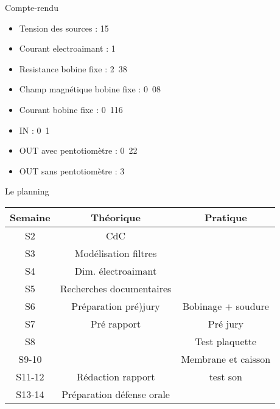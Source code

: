 \documentclass[pdf]{beamer}
\begin{document}
\begin{frame}{Compte-rendu}
	\begin{itemize}
		\item Tension des sources :  \unit{15}{\volt}
		\item Courant electroaimant : \unit{1}{\ampere}
		\item Resistance bobine fixe : \unit{2.38}{\ohm}
		\item Champ magnétique bobine fixe : \unit{0.08}{\tesla}
		\item Courant bobine fixe : \unit{0.116}{\ampere}
		\item IN : \unit{0.1}{\volt}
		\item OUT avec pentotiomètre : \unit{0.22}{\volt}
		\item OUT sans pentotiomètre : \unit{3}{\volt}
	\end{itemize}
\end{frame}

\begin{frame}{Le planning}

		\begin{tabular}{|c|c|c|}
		\hline
		Semaine & Théorique & Pratique \\
		\hline
		S2 & CdC &\\
		\hline
		S3 & Modélisation filtres &\\
		\hline
		S4 & Dim. électroaimant &\\
		\hline
		S5 & Recherches documentaires & \\
		\hline
		S6 & Préparation pré)jury & Bobinage + soudure\\
		\hline
		S7 & Pré rapport & Pré jury\\
		\hline
		S8 & & Test plaquette\\
		\hline
		S9-10 & & Membrane et caisson\\
		\hline
		S11-12 & Rédaction rapport & test son\\
		\hline
		S13-14 & Préparation défense orale &\\
		\hline
		
		\end{tabular}
\end{frame}
\end{document}
